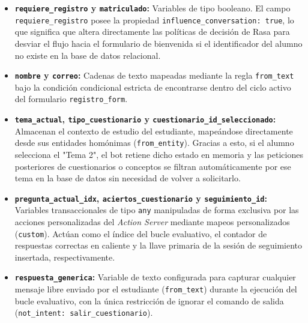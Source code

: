 \documentclass[a4paper,12pt,twoside,final]{book}
\begin{document}
\begin{itemize}
    \item \textbf{\texttt{requiere\_registro} y \texttt{matriculado}:} Variables de tipo booleano. El campo \texttt{requiere\_registro} posee la propiedad \texttt{influence\_conversation: true}, lo que significa que altera directamente las políticas de decisión de Rasa para desviar el flujo hacia el formulario de bienvenida si el identificador del alumno no existe en la base de datos relacional.
    \item \textbf{\texttt{nombre} y \texttt{correo}:} Cadenas de texto mapeadas mediante la regla \texttt{from\_text} bajo la condición condicional estricta de encontrarse dentro del ciclo activo del formulario \texttt{registro\_form}.
    \item \textbf{\texttt{tema\_actual}, \texttt{tipo\_cuestionario} y \texttt{cuestionario\_id\_seleccionado}:} Almacenan el contexto de estudio del estudiante, mapeándose directamente desde sus entidades homónimas (\texttt{from\_entity}). Gracias a esto, si el alumno selecciona el "Tema 2", el bot retiene dicho estado en memoria y las peticiones posteriores de cuestionarios o conceptos se filtran automáticamente por ese tema en la base de datos sin necesidad de volver a solicitarlo.
    \item \textbf{\texttt{pregunta\_actual\_idx}, \texttt{aciertos\_cuestionario} y \texttt{seguimiento\_id}:} Variables transaccionales de tipo \texttt{any} manipuladas de forma exclusiva por las acciones personalizadas del \textit{Action Server} mediante mapeos personalizados (\texttt{custom}). Actúan como el índice del bucle evaluativo, el contador de respuestas correctas en caliente y la llave primaria de la sesión de seguimiento insertada, respectivamente.
    \item \textbf{\texttt{respuesta\_generica}:} Variable de texto configurada para capturar cualquier mensaje libre enviado por el estudiante (\texttt{from\_text}) durante la ejecución del bucle evaluativo, con la única restricción de ignorar el comando de salida (\texttt{not\_intent: salir\_cuestionario}).
\end{itemize}
\end{document}
